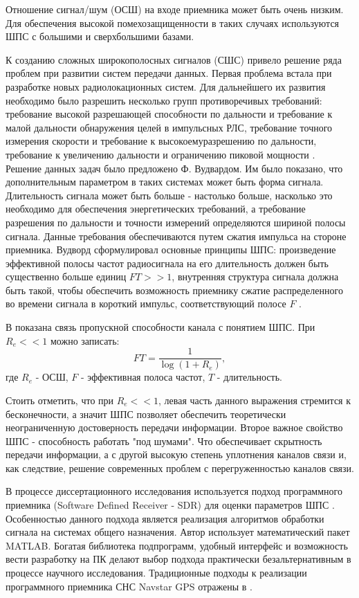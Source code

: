 Отношение сигнал/шум (ОСШ) на входе приемника может быть очень низким. Для обеспечения высокой помехозащищенности 
в таких случаях используются ШПС с большими и сверхбольшими базами.

К созданию сложных широкополосных сигналов (СШС) привело решение ряда проблем при развитии систем передачи данных.
Первая проблема встала при разработке новых радиолокационных систем. Для дальнейшего их развития необходимо было 
разрешить несколько групп противоречивых требований: требование высокой разрешающей способности по дальности и требование к малой дальности обнаружения
целей в импульсных РЛС, требование точного измерения скорости и требование к высокоемуразрешению по дальности, требование к
увеличению дальности и ограничению пиковой мощности \cite{gantmaher-book}. Решение данных задач было предложено
Ф. Вудвардом. Им было показано, что дополнительным параметром в таких системах может быть форма сигнала. Длительность сигнала
может быть больше - настолько больше, насколько это необходимо для обеспечения энергетических требований, а требование
разрешения по дальности и точности измерений определяются шириной полосы сигнала. Данные требования обеспечиваются
путем сжатия импульса на стороне приемника. Вудворд сформулировал основные принципы ШПС: произведение эффективной полосы частот
радиосигнала на его длительность должен быть существенно больше единиц ${FT>>1}$, внутренняя структура сигнала
должна быть такой, чтобы обеспечить возможность приемнику сжатие распределенного во времени сигнала в короткий импульс,
соответствующий полосе ${F}$ \cite{gantmaher-book}.

В \cite{gantmaher-book} показана связь пропускной способности канала с понятием ШПС. При ${R_e<<1}$ можно записать:
\begin{equation}
	FT = \frac{1}{\log(1+R_e)}, \nonumber
\end{equation}
где ${R_e}$ - ОСШ, ${F}$ - эффективная полоса частот, ${T}$ - длительность.

Стоить отметить, что при ${R_e<<1}$, левая часть данного выражения стремится к бесконечности, а значит
ШПС позволяет обеспечить теоретически неограниченную достоверность передачи информации. Второе важное свойство
ШПС - способность работать "под шумами". Что обеспечивает скрытность
передачи информации, а с другой высокую степень уплотнения каналов связи и, как следствие, решение современных проблем
с перегруженностью каналов связи.

В процессе диссертационного исследования используется подход программного приемника (Software Defined Receiver - SDR)
для оценки параметров ШПС \cite{akos-book, grayver-book, pany-book}. Особенностью данного подхода является реализация алгоритмов
обработки сигнала на системах общего назначения. Автор использует математический пакет MATLAB. Богатая библиотека подпрограмм, удобный интерфейс
и возможность вести разработку на ПК делают выбор подхода практически безальтернативным в процессе научного исследования.
Традиционные подходы к реализации программного приемника СНС Navstar GPS отражены в \cite{akos-book, tsui}. 

